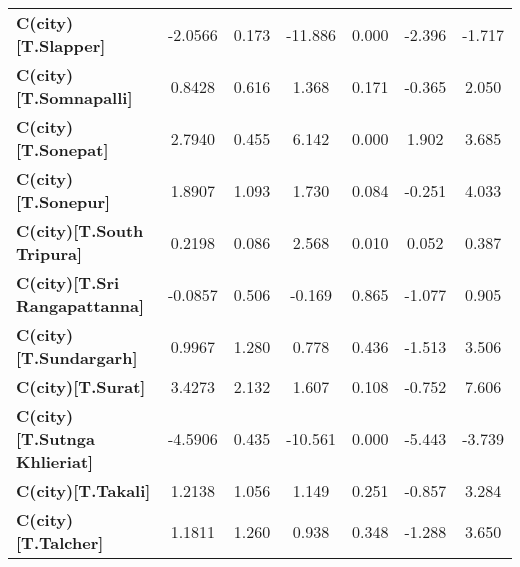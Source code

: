 \begin{center}
\begin{tabular}{lcccccc}
\textbf{C(city)[T.Slapper]}                                                                         &      -2.0566  &        0.173     &   -11.886  &         0.000        &       -2.396    &       -1.717     \\
\textbf{C(city)[T.Somnapalli]}                                                                      &       0.8428  &        0.616     &     1.368  &         0.171        &       -0.365    &        2.050     \\
\textbf{C(city)[T.Sonepat]}                                                                         &       2.7940  &        0.455     &     6.142  &         0.000        &        1.902    &        3.685     \\
\textbf{C(city)[T.Sonepur]}                                                                         &       1.8907  &        1.093     &     1.730  &         0.084        &       -0.251    &        4.033     \\
\textbf{C(city)[T.South Tripura]}                                                                   &       0.2198  &        0.086     &     2.568  &         0.010        &        0.052    &        0.387     \\
\textbf{C(city)[T.Sri Rangapattanna]}                                                               &      -0.0857  &        0.506     &    -0.169  &         0.865        &       -1.077    &        0.905     \\
\textbf{C(city)[T.Sundargarh]}                                                                      &       0.9967  &        1.280     &     0.778  &         0.436        &       -1.513    &        3.506     \\
\textbf{C(city)[T.Surat]}                                                                           &       3.4273  &        2.132     &     1.607  &         0.108        &       -0.752    &        7.606     \\
\textbf{C(city)[T.Sutnga Khlieriat]}                                                                &      -4.5906  &        0.435     &   -10.561  &         0.000        &       -5.443    &       -3.739     \\
\textbf{C(city)[T.Takali]}                                                                          &       1.2138  &        1.056     &     1.149  &         0.251        &       -0.857    &        3.284     \\
\textbf{C(city)[T.Talcher]}                                                                         &       1.1811  &        1.260     &     0.938  &         0.348        &       -1.288    &        3.650     \\

\end{tabular}
\end{center}
